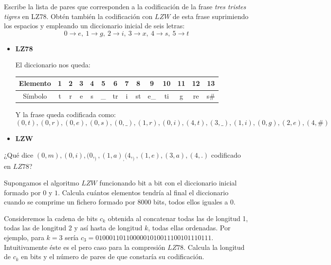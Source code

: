 \begin{problem}[14]
Escribe la lista de pares que corresponden a la codificación de la frase \textit{tres tristes tigres} en LZ78. Obtén también la codificación con $LZW$ de esta frase suprimiendo los espacios y empleando un diccionario inicial de seis letras:
\[0 \to e, \ 1 \to g, \ 2 \to i, \ 3 \to x, \ 4 \to s, \ 5 \to t\]
\solution

\yoP

\begin{itemize}
\item \textbf{LZ78}

El diccionario nos queda:
\begin{center}
\begin{tabular}{ | c | c | c | c | c | c | c | c | c | c | c | c | c | c |}
   \hline
   Elemento & 1 & 2 & 3 & 4 & 5 & 6 & 7 & 8 & 9 & 10 & 11 & 12 & 13\\
   \hline
   Símbolo & t & r & e & s & \_ & tr & i & st & e\_ & ti & g & re &s\#\\
   \hline
 \end{tabular}
\end{center}

Y la frase queda codificada como:
\[(0,t),(0,r),(0,e),(0,s),(0,\_),(1, r),(0,i),(4,t),(3,\_),(1,i),(0,g),(2,e),(4,\#)\]

\item \textbf{LZW}
\end{itemize}
\end{problem}

\begin{problem}[15]
¿Qué dice $(0,m),(0,i),(0,_),(1,a)_,(4,_),(1,e),(3,a),(4,.)$ codificado en $LZ78$?
\solution
\end{problem}

\begin{problem}[16]
Supongamos el algoritmo $LZW$ funcionando bit a bit con el diccionario inicial formado por $0$ y $1$. Calcula cuántos elementos tendría al final el diccionario cuando se comprime un fichero formado por 8000 bits, todos ellos iguales a 0.
\solution
\end{problem}

\begin{problem}[17]
Consideremos la cadena de bits $c_k$ obtenida al concatenar todas las de longitud 1, todas las de longitud 2 y así hasta de longitud $k$, todas ellas ordenadas. Por ejemplo, para $k=3$ sería $c_3=0100011011000001010011100101110111$. Intuitivamente éste es el pero caso para la compresión $LZ78$. Calcula la longitud de $c_k$ en bits y el número de pares de que constaría su codificación.
\solution
\end{problem}

